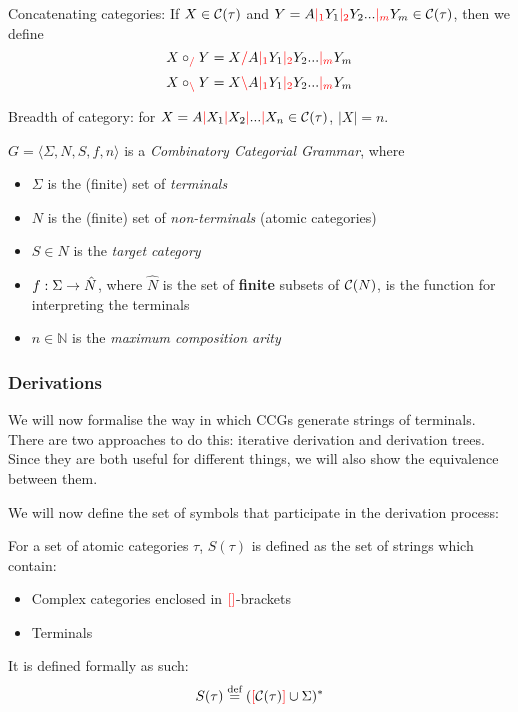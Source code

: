 \documentclass[main.tex]{subfiles}
\begin{document}
\begin{defn}
    Concatenating categories: If $X \in \mathcal{C}( \tau )$ and
    $Y = A \textcolor{red}{|_{1}} Y_1 \textcolor{red}{|_{2}} Y_2 ... \textcolor{red}{|_{m}} Y_m \in \mathcal{C}( \tau )$, then we define
    \[ X \circ_{\textcolor{red}{/}} Y = X \textcolor{red}{/} A \textcolor{red}{|_{1}} Y_1 \textcolor{red}{|_{2}} Y_2 ... \textcolor{red}{|_{m}} Y_m \]
    \[ X \circ_{\textcolor{red}{\backslash}} Y = X \textcolor{red}{\backslash} A \textcolor{red}{|_{1}} Y_1 \textcolor{red}{|_{2}} Y_2 ... \textcolor{red}{|_{m}} Y_m \]
\end{defn}

\begin{defn}
    Breadth of category: for $X = A \textcolor{red}{|} X_1 \textcolor{red}{|} X_2 \textcolor{red}{|} ... \textcolor{red}{|} X_n \in \mathcal{C}( \tau )$,
    $|X| = n$.
\end{defn}

\begin{defn}
    $ G = \langle \Sigma, N, S, f, n \rangle $ is a \emph{Combinatory Categorial Grammar}, where
    \begin{itemize}
        \item $ \Sigma $ is the (finite) set of \emph{terminals}
        \item $ N $ is the (finite) set of \emph{non-terminals} (atomic categories)
        \item $ S \in N $ is the \emph{target category}
        \item $ f : \Sigma \rightarrow \hat{N} $, where $\hat{N}$ is the set of
            \textbf{finite} subsets of $\mathcal{C}( N )$, is the function for interpreting the
            terminals
        \item $ n \in \mathbb{N} $ is the \emph{maximum composition arity}
    \end{itemize}
\end{defn}

\subsubsection{Derivations}

We will now formalise the way in which CCGs generate strings of terminals. There
are two approaches to do this: iterative derivation and derivation trees. Since
they are both useful for different things, we will also show the equivalence
between them.


We will now define the set of symbols that participate in the derivation process:
\begin{defn}
    For a set of atomic categories $\tau$, $S(\tau)$ is defined as the set of
    strings which contain:
    \begin{itemize}
        \item Complex categories enclosed in $\textcolor{red}{[} \textcolor{red}{]}$-brackets
        \item Terminals
    \end{itemize}

    It is defined formally as such:
    \[ S(\tau) \overset{\text{\scriptsize def}}{=} (\textcolor{red}{[} \mathcal{C}( \tau ) \textcolor{red}{]} \cup \Sigma)^* \]
\end{defn}
\end{document}
